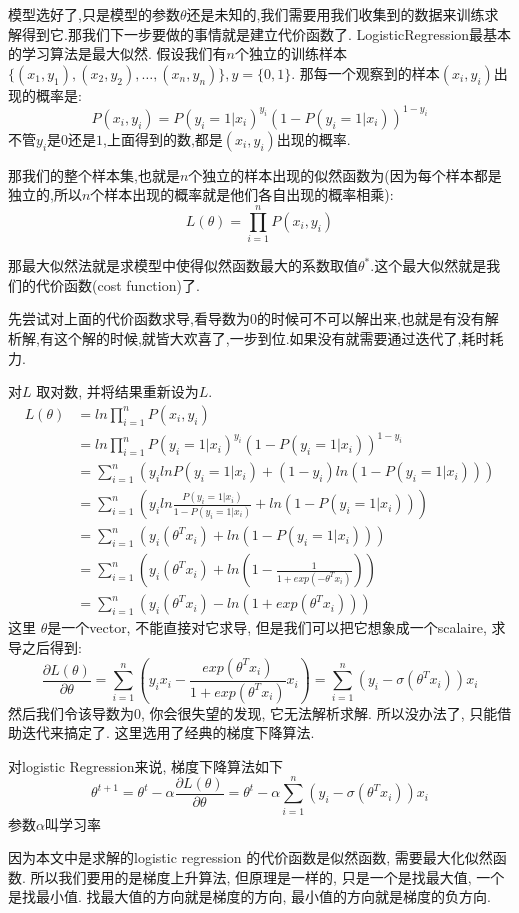 模型选好了,只是模型的参数$\theta$还是未知的,我们需要用我们收集到的数据来训练求解得到它.那我们下一步要做的事情就是建立代价函数了.
LogisticRegression最基本的学习算法是最大似然.
假设我们有$n$个独立的训练样本$\{(x_1, y_1) ,(x_2, y_2), \ldots ,(x_n, y_n)\},y = \{0, 1\}$.
那每一个观察到的样本$(x_i, y_i)$出现的概率是:
$$
P(x_i, y_i) = P(y_i = 1 | x_i)^{y_i} (1 - P(y_i = 1 | x_i))^{1 - y_i}
$$
不管$y_i$是$0$还是$1$,上面得到的数,都是$(x_i, y_i)$出现的概率.

那我们的整个样本集,也就是$n$个独立的样本出现的似然函数为(因为每个样本都是独立的,所以$n$个样本出现的概率就是他们各自出现的概率相乘):
$$
L(\theta)
= \prod_{i = 1}^{n} P(x_i, y_i)
$$

那最大似然法就是求模型中使得似然函数最大的系数取值$\theta^*$.这个最大似然就是我们的代价函数(cost function)了.

先尝试对上面的代价函数求导,看导数为0的时候可不可以解出来,也就是有没有解析解,有这个解的时候,就皆大欢喜了,一步到位.如果没有就需要通过迭代了,耗时耗力.

对$L$ 取对数, 并将结果重新设为$L$.
$$
\begin{aligned}
L(\theta)
& = ln \prod_{i = 1}^{n} P(x_i, y_i) \\
& = ln \prod_{i = 1}^{n} P(y_i = 1 | x_i)^{y_i} (1 - P(y_i = 1 | x_i))^{1 - y_i} \\
& = \sum_{i = 1}^{n} (y_i ln P(y_i = 1 | x_i) + (1 - y_i) ln (1 - P(y_i = 1 | x_i))) \\
& = \sum_{i = 1}^{n} (y_i ln \frac{P(y_i = 1 | x_i)}{1 - P(y_i = 1 | x_i)} + ln (1 - P(y_i = 1 | x_i))) \\
& = \sum_{i = 1}^{n} (y_i (\theta^T x_i) + ln (1 - P(y_i = 1 | x_i))) \\
& = \sum_{i = 1}^{n} (y_i (\theta^T x_i) + ln (1 - \frac{1}{1 + exp(- \theta^T x_i)})) \\
& = \sum_{i = 1}^{n} (y_i (\theta^T x_i) - ln (1 + exp(\theta^T x_i)))
\end{aligned}
$$
这里 $\theta$是一个vector, 不能直接对它求导, 但是我们可以把它想象成一个scalaire, 求导之后得到:
$$
\frac{\partial L(\theta)}{\partial \theta}
= \sum_{i = 1}^n (y_i x_i - \frac{exp(\theta^T x_i)}{1 + exp(\theta^T x_i)} x_i)
= \sum_{i = 1}^n (y_i - \sigma(\theta^T x_i)) x_i
$$
然后我们令该导数为$0$, 你会很失望的发现, 它无法解析求解. 所以没办法了, 只能借助迭代来搞定了. 这里选用了经典的梯度下降算法.

对logistic Regression来说, 梯度下降算法如下
$$
\theta^{t + 1}
= \theta^t - \alpha \frac{\partial L(\theta)}{\partial \theta}
= \theta^t - \alpha \sum_{i = 1}^n (y_i - \sigma(\theta^T x_i)) x_i
$$
参数$\alpha$叫学习率

因为本文中是求解的logistic regression 的代价函数是似然函数, 需要最大化似然函数. 所以我们要用的是梯度上升算法, 但原理是一样的, 只是一个是找最大值, 一个是找最小值.
找最大值的方向就是梯度的方向, 最小值的方向就是梯度的负方向.

